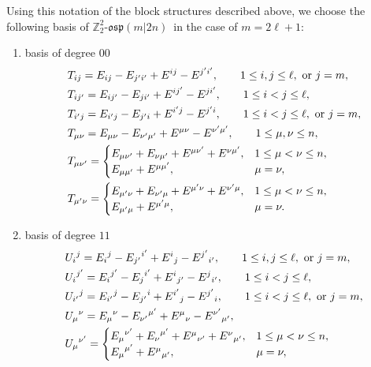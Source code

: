 \documentclass[pdftex]{sigma}
\numberwithin{equation}{section}
\theoremstyle{definition}
\def\Z2{\mathbb{Z}_2^2}
\def\osp{\mathfrak{osp}}
\def\Zosp{$\Z2$-$\osp(m|2n)$}
\begin{document}
Using this notation of the block structures described above, we choose the following basis of \Zosp\ in the case of $ m= 2\ell + 1$:
\begin{enumerate}\itemsep=0pt
\item[(i)] basis of degree $00$
\begin{align*}
	&T_{ij}=E_{ij}-E_{j'i'}+E^{ij}-E^{j'i'}, \qquad 1 \leq i, j \leq \ell, \text{ or } j=m,
	\notag\\
	&T_{ij'}=E_{ij'}-E_{ji'}+E^{ij'}-E^{ji'},\qquad 1 \leq i< j \leq \ell,
	\notag\\
	&T_{i'j}=E_{i'j}-E_{j'i}+E^{i'j}-E^{j'i},\qquad 1 \leq i< j \leq \ell, \text{ or } j=m,
	\notag\\
	&T_{\mu\nu}=E_{\mu\nu}-E_{\nu'\mu'}+E^{\mu\nu}-E^{\nu'\mu'}, \qquad 1 \leq \mu, \nu \leq n,
	\notag\\
	&T_{\mu\nu'}=
	\begin{cases}
		E_{\mu\nu'}+E_{\nu\mu'}+E^{\mu\nu'}+E^{\nu\mu'},& 1 \leq \mu<\nu \leq n,\\
		E_{\mu\mu'}+E^{\mu\mu'},&\mu=\nu,
	\end{cases}
	\notag\\
	&T_{\mu'\nu}=
	\begin{cases}
		E_{\mu'\nu}+E_{\nu'\mu}+E^{\mu'\nu}+E^{\nu'\mu},& 1 \leq \mu<\nu \leq n,\\
		E_{\mu'\mu}+E^{\mu'\mu}, & \mu=\nu.
	\end{cases}
\end{align*}
\item[(ii)] basis of degree $11$
\begin{align*}
	&{U_{i}}^{j}={E_{i}}^{j}-{E_{j'}}^{i'}+{E^{i}}_{j}-{E^{j'}}_{i'}, \qquad 1 \leq i, j \leq \ell, \text{ or } j=m,
	\notag\\
	&{U_{i}}^{j'}={E_{i}}^{j'}-{E_{j}}^{i'}+{E^{i}}_{j'}-{E^{j}}_{i'},\qquad 1 \leq i< j \leq \ell,
	\notag\\
	&{U_{i'}}^{j}={E_{i'}}^{j}-{E_{j'}}^{i}+{E^{i'}}_{j}-{E^{j'}}_{i},\qquad 1 \leq i< j \leq \ell, \text{ or } j=m,
	\notag\\
	&{U_{\mu}}^{\nu}={E_{\mu}}^{\nu}-{E_{\nu'}}^{\mu'}+{E^{\mu}}_{\nu}-{E^{\nu'}}_{\mu'},
	\notag\\
	&{U_{\mu}}^{\nu'}=
	\begin{cases}
		{E_{\mu}}^{\nu'}+{E_{\nu}}^{\mu'}+{E^{\mu}}_{\nu'}+{E^{\nu}}_{\mu'},& 1 \leq \mu<\nu \leq n,\\
		{E_{\mu}}^{\mu'}+{E^{\mu}}_{\mu'},& \mu=\nu,
	\end{cases}
	\notag\\

\end{align*}
\end{enumerate}
\end{document}
